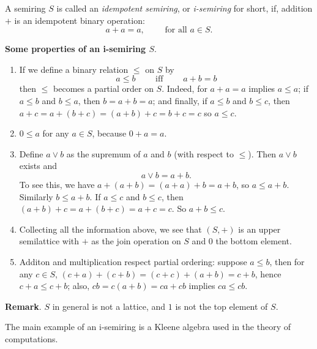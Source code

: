 \documentclass[12pt]{article}
\begin{document}
A semiring $S$ is called an \emph{idempotent semiring}, or \emph{i-semiring} for short, if, addition $+$ is an idempotent binary operation:
$$a+a=a,\qquad\mbox{ for all }a\in S.$$

\textbf{Some properties of an i-semiring $S$}.
\begin{enumerate}
\item If we define a binary relation $\le$ on $S$ by 
$$a\le b\qquad\mbox{ iff }\qquad a+b=b$$
then $\le$ becomes a partial order on $S$.  Indeed, for $a+a=a$ implies $a\le a$; if $a\le b$ and $b\le a$, then $b=a+b=a$; and finally, if $a\le b$ and $b\le c$, then $a+c=a+(b+c)=(a+b)+c=b+c=c$ so $a\le c$.
\item $0\le a$ for any $a\in S$, because $0+a=a$.
\item Define $a\vee b$ as the supremum of $a$ and $b$ (with respect to $\le$).  Then $a\vee b$ exists and $$a\vee b=a+b.$$ To see this, we have $a+(a+b)=(a+a)+b=a+b$, so $a\le a+b$.  Similarly $b\le a+b$.  If $a\le c$ and $b\le c$, then $(a+b)+c=a+(b+c)=a+c=c$.  So $a+b\le c$.
\item Collecting all the information above, we see that $(S,+)$ is an upper semilattice with $+$ as the join operation on $S$ and $0$ the bottom element.
\item Additon and multiplication respect partial ordering: suppose $a\le b$, then for any $c\in S$, $(c+a)+(c+b)=(c+c)+(a+b)=c+b$, hence $c+a\le c+b$; also, $cb=c(a+b)=ca+cb$ implies $ca\le cb$.
\end{enumerate}

\textbf{Remark}.  $S$ in general is not a lattice, and $1$ is not the top element of $S$.

The main example of an i-semiring is a Kleene algebra used in the theory of computations.
\end{document}
